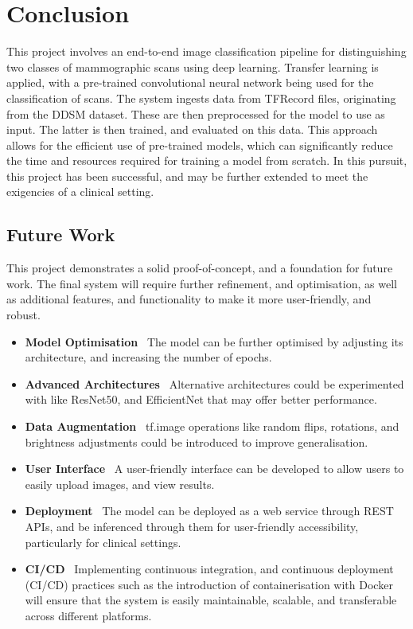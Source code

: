 \documentclass[../main]{subfiles}
\begin{document}
\chapter{Conclusion}
This project involves an end-to-end image classification pipeline for distinguishing two classes of mammographic scans using deep learning. Transfer learning is applied, with a pre-trained convolutional neural network being used for the classification of scans. The system ingests data from TFRecord files, originating from the DDSM dataset. These are then preprocessed for the model to use as input. The latter is then trained, and evaluated on this data. This approach allows for the efficient use of pre-trained models, which can significantly reduce the time and resources required for training a model from scratch. In this pursuit, this project has been successful, and may be further extended to meet the exigencies of a clinical setting.

\section{Future Work}
This project demonstrates a solid proof-of-concept, and a foundation for future work. The final system will require further refinement, and optimisation, as well as additional features, and functionality to make it more user-friendly, and robust.

\begin{itemize}
	\item \textbf{Model Optimisation} \textemdash\ The model can be further optimised by adjusting its architecture, and increasing the number of epochs.
	\item \textbf{Advanced Architectures} \textemdash\ Alternative architectures could be experimented with like ResNet50, and EfficientNet that may offer better performance.
	\item \textbf{Data Augmentation} \textemdash\ tf.image operations like random flips, rotations, and brightness adjustments could be introduced to improve generalisation.
	\item \textbf{User Interface} \textemdash\ A user-friendly interface can be developed to allow users to easily upload images, and view results.
	\item \textbf{Deployment} \textemdash\ The model can be deployed as a web service through REST APIs, and be inferenced through them for user-friendly accessibility, particularly for clinical settings.
	\item \textbf{CI/CD} \textemdash\ Implementing continuous integration, and continuous deployment (CI/CD) practices such as the introduction of containerisation with Docker will ensure that the system is easily maintainable, scalable, and transferable across different platforms.
\end{itemize}
\end{document}
